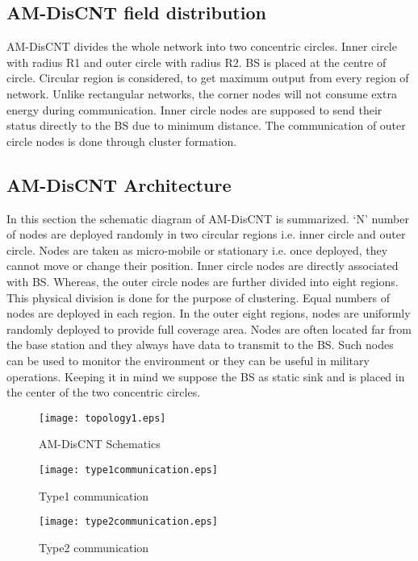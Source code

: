 \documentclass[journal]{IEEEtran}
\begin{document}
\subsection{AM-DisCNT field distribution}
 AM-DisCNT divides the whole network into two concentric circles. Inner circle with radius R1 and outer circle with radius R2. BS is placed at the centre of circle. Circular region is considered, to get maximum output from every region of network. Unlike rectangular networks, the corner nodes will not consume extra energy during communication. Inner circle nodes are supposed to send their status directly to the BS due to minimum distance. The communication of outer circle nodes is done through cluster formation.
\subsection{AM-DisCNT Architecture}
 In this section the schematic diagram of AM-DisCNT is summarized. ‘N’ number of nodes are deployed randomly in two circular regions i.e. inner circle and outer circle. Nodes are taken as micro-mobile or stationary i.e. once deployed, they cannot move or change their position. Inner circle nodes are directly associated with BS. Whereas, the outer circle nodes are further divided into eight regions. This physical division is done for the purpose of clustering. Equal numbers of nodes are deployed in each region. In the outer eight regions, nodes are uniformly randomly deployed to provide full coverage area.
 Nodes are often located far from the base station and they always have data to transmit to the BS. Such nodes can be used to monitor the environment or they can be useful in military operations. Keeping it in mind we suppose the BS as static sink and is placed in the center of the two concentric circles.
\begin{figure*}[ht]
\begin{center}
\texttt{[image: topology1.eps]}
\caption{AM-DisCNT Schematics}
\end{center}
\end{figure*}

\begin{figure}[ht]
\begin{center}
\texttt{[image: type1communication.eps]}
\caption{Type1 communication }
\end{center}
\end{figure}

\begin{figure}[ht]
\begin{center}
\texttt{[image: type2communication.eps]}
\caption{Type2 communication }
\end{center}
\end{figure}
\end{document}
